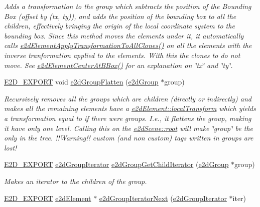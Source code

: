 \begin{DoxyCompactItemize}
\begin{DoxyCompactList}\small\item\em Adds a transformation to the group which subtracts the position of the Bounding Box (offset by (tx, ty)), and adds the position of the bounding box to all the children, effectively bringing the origin of the local coordinate system to the bounding box. Since this method moves the elements under it, it automatically calls \hyperlink{group__e2dElement_ga93766be398e89c9f4cc25a4170db3b18}{e2d\-Element\-Apply\-Transformation\-To\-All\-Clones()} on all the elements with the inverse tranformation applied to the elements. With this the clones to do not move. See \hyperlink{group__e2dElement_gab829b280fa22a3509c40425fc84b5061}{e2d\-Element\-Center\-At\-B\-Box()} for an explanation on \char`\"{}tx\char`\"{} and \char`\"{}ty\char`\"{}. \end{DoxyCompactList}\item 
\hyperlink{Ez2DS_8h_a9f14e9cb869e1a85fdaba03afcca0df9}{E2\-D\-\_\-\-E\-X\-P\-O\-R\-T} void \hyperlink{group__e2dGroup_ga406ebab73c321b771a9a58e26c3a5d79}{e2d\-Group\-Flatten} (\hyperlink{structe2dGroup}{e2d\-Group} $\ast$group)
\begin{DoxyCompactList}\small\item\em Recursively removes all the groups which are children (directly or indirectly) and makes all the remaining elements have a \hyperlink{structe2dElement_a52bda732df714953f93c1e6f5f7c7c93}{e2d\-Element\-::local\-Transform} which yields a transformation equal to if there were groups. I.\-e., it flattens the group, making it have only one level. Calling this on the \hyperlink{structe2dScene_aa5444ac46bf18449921a4094bcadde1c}{e2d\-Scene\-::root} will make \char`\"{}group\char`\"{} be the only in the tree. !!\-Warning!! custom (and non custom) tags written in groups are lost! \end{DoxyCompactList}\item 
\hyperlink{Ez2DS_8h_a9f14e9cb869e1a85fdaba03afcca0df9}{E2\-D\-\_\-\-E\-X\-P\-O\-R\-T} \hyperlink{structe2dGroupIterator}{e2d\-Group\-Iterator} \hyperlink{group__e2dGroup_ga35b130caa1b107616881615e9c8fb9ad}{e2d\-Group\-Get\-Child\-Iterator} (\hyperlink{structe2dGroup}{e2d\-Group} $\ast$group)
\begin{DoxyCompactList}\small\item\em Makes an iterator to the children of the group. \end{DoxyCompactList}\item 
\hyperlink{Ez2DS_8h_a9f14e9cb869e1a85fdaba03afcca0df9}{E2\-D\-\_\-\-E\-X\-P\-O\-R\-T} \hyperlink{structe2dElement}{e2d\-Element} $\ast$ \hyperlink{group__e2dGroup_ga5a20617c4666d240ab6c0efdde72d23f}{e2d\-Group\-Iterator\-Next} (\hyperlink{structe2dGroupIterator}{e2d\-Group\-Iterator} $\ast$iter)

\end{DoxyCompactItemize}
